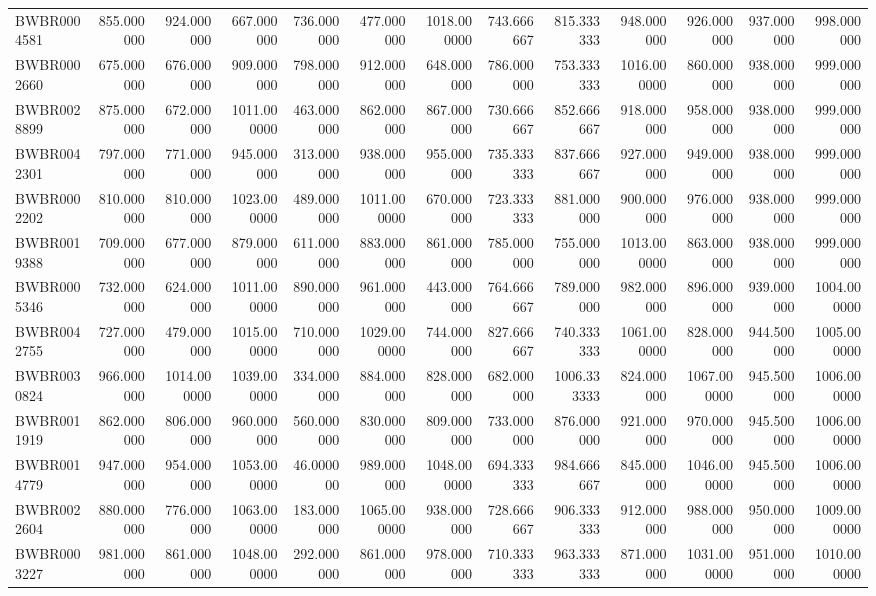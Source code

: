 \begin{longtable}{lrrrrrrrrrrrr}
BWBR0004581 & 855.000000 & 924.000000 & 667.000000 & 736.000000 & 477.000000 & 1018.000000 & 743.666667 & 815.333333 & 948.000000 & 926.000000 & 937.000000 & 998.000000 \\
BWBR0002660 & 675.000000 & 676.000000 & 909.000000 & 798.000000 & 912.000000 & 648.000000 & 786.000000 & 753.333333 & 1016.000000 & 860.000000 & 938.000000 & 999.000000 \\
BWBR0028899 & 875.000000 & 672.000000 & 1011.000000 & 463.000000 & 862.000000 & 867.000000 & 730.666667 & 852.666667 & 918.000000 & 958.000000 & 938.000000 & 999.000000 \\
BWBR0042301 & 797.000000 & 771.000000 & 945.000000 & 313.000000 & 938.000000 & 955.000000 & 735.333333 & 837.666667 & 927.000000 & 949.000000 & 938.000000 & 999.000000 \\
BWBR0002202 & 810.000000 & 810.000000 & 1023.000000 & 489.000000 & 1011.000000 & 670.000000 & 723.333333 & 881.000000 & 900.000000 & 976.000000 & 938.000000 & 999.000000 \\
BWBR0019388 & 709.000000 & 677.000000 & 879.000000 & 611.000000 & 883.000000 & 861.000000 & 785.000000 & 755.000000 & 1013.000000 & 863.000000 & 938.000000 & 999.000000 \\
BWBR0005346 & 732.000000 & 624.000000 & 1011.000000 & 890.000000 & 961.000000 & 443.000000 & 764.666667 & 789.000000 & 982.000000 & 896.000000 & 939.000000 & 1004.000000 \\
BWBR0042755 & 727.000000 & 479.000000 & 1015.000000 & 710.000000 & 1029.000000 & 744.000000 & 827.666667 & 740.333333 & 1061.000000 & 828.000000 & 944.500000 & 1005.000000 \\
BWBR0030824 & 966.000000 & 1014.000000 & 1039.000000 & 334.000000 & 884.000000 & 828.000000 & 682.000000 & 1006.333333 & 824.000000 & 1067.000000 & 945.500000 & 1006.000000 \\
BWBR0011919 & 862.000000 & 806.000000 & 960.000000 & 560.000000 & 830.000000 & 809.000000 & 733.000000 & 876.000000 & 921.000000 & 970.000000 & 945.500000 & 1006.000000 \\
BWBR0014779 & 947.000000 & 954.000000 & 1053.000000 & 46.000000 & 989.000000 & 1048.000000 & 694.333333 & 984.666667 & 845.000000 & 1046.000000 & 945.500000 & 1006.000000 \\
BWBR0022604 & 880.000000 & 776.000000 & 1063.000000 & 183.000000 & 1065.000000 & 938.000000 & 728.666667 & 906.333333 & 912.000000 & 988.000000 & 950.000000 & 1009.000000 \\
BWBR0003227 & 981.000000 & 861.000000 & 1048.000000 & 292.000000 & 861.000000 & 978.000000 & 710.333333 & 963.333333 & 871.000000 & 1031.000000 & 951.000000 & 1010.000000 \\

\end{longtable}
